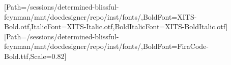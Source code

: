 \usepackage{fontspec}
\usepackage{anyfontsize}
\setmainfont{XITS-Regular.otf}[Path=/sessions/determined-blissful-feynman/mnt/docdesigner/repo/inst/fonts/,BoldFont=XITS-Bold.otf,ItalicFont=XITS-Italic.otf,BoldItalicFont=XITS-BoldItalic.otf]
\setmonofont{FiraCode-Regular.ttf}[Path=/sessions/determined-blissful-feynman/mnt/docdesigner/repo/inst/fonts/,BoldFont=FiraCode-Bold.ttf,Scale=0.82]
\usepackage{xcolor}
\color{text}
\usepackage[explicit]{titlesec}
\titlespacing*{\section}{0pt}{1.7em}{0.5em}
\titlespacing*{\subsection}{0pt}{1.1em}{0.3em}
\titlespacing*{\subsubsection}{0pt}{0.9em}{0.2em}
\usepackage{titling}
\pretitle{\begin{flushleft}\fontsize{26.0}{28.6}\selectfont\bfseries\color{accent}}
\posttitle{\par\end{flushleft}\vskip0.4em}
\preauthor{\begin{flushleft}\large\color{muted}}
\postauthor{\end{flushleft}}
\predate{\begin{flushleft}\color{muted}}
\postdate{\end{flushleft}}
\usepackage{microtype}
\usepackage{booktabs}
\renewcommand{\arraystretch}{1.2}
\setlength{\parindent}{0pt}
\setlength{\parskip}{0.5em}
\linespread{1.3}
\usepackage{fancyhdr}\pagestyle{fancy}\fancyhf{}
\renewcommand{\headrulewidth}{0pt}\renewcommand{\footrulewidth}{0.4pt}
\fancyfoot[R]{\small\color{muted}\thepage}